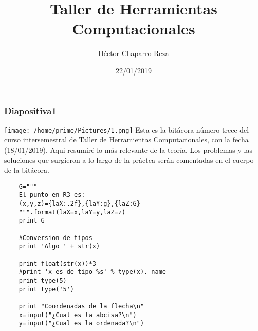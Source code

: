 \documentclass{beamer}
\title{Taller de Herramientas Computacionales}
\author{Héctor Chaparro Reza}
\date{22/01/2019}
\begin{document}
\begin{frame}
\frametitle{Diapositiva1}
\begin{center}
	\texttt{[image: /home/prime/Pictures/1.png]}
	Esta es la bit\'acora número trece del curso intersemestral de Taller de Herramientas Computacionales, con la fecha (18/01/2019). Aqui resumir\'e lo m\'as relevante de la teor\'ia. Los problemas y las soluciones que surgieron a lo largo de la pr\'actca ser\'an comentadas en el cuerpo de la bit\'acora.
\end{center}
\end{frame}

\begin{frame}[fragile]
	\begin{verbatim}
	G="""
	El punto en R3 es:
	(x,y,z)={laX:.2f},{laY:g},{laZ:G} 
	""".format(laX=x,laY=y,laZ=z)
	print G
	
	#Conversion de tipos
	print 'Algo ' + str(x)
	
	print float(str(x))*3
	#print 'x es de tipo %s' % type(x)._name_
	print type(5)
	print type('5')
	
	print "Coordenadas de la flecha\n"
	x=input("¿Cual es la abcisa?\n")
	y=input("¿Cual es la ordenada?\n")	
	\end{verbatim}
\end{frame}
	
\end{document}
